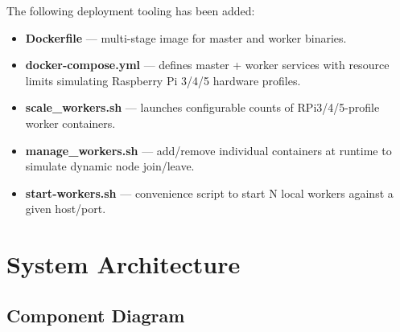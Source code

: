 \documentclass[12pt,a4paper]{article}
\begin{document}
The following deployment tooling has been added:
\begin{itemize}[noitemsep]
    \item \textbf{Dockerfile} --- multi-stage image for master and worker binaries.
    \item \textbf{docker-compose.yml} --- defines master + worker services with resource limits simulating Raspberry Pi 3/4/5 hardware profiles.
    \item \textbf{scale\_workers.sh} --- launches configurable counts of RPi3/4/5-profile worker containers.
    \item \textbf{manage\_workers.sh} --- add/remove individual containers at runtime to simulate dynamic node join/leave.
    \item \textbf{start-workers.sh} --- convenience script to start N local workers against a given host/port.
\end{itemize}

\section{System Architecture}

\subsection{Component Diagram}
\end{document}
